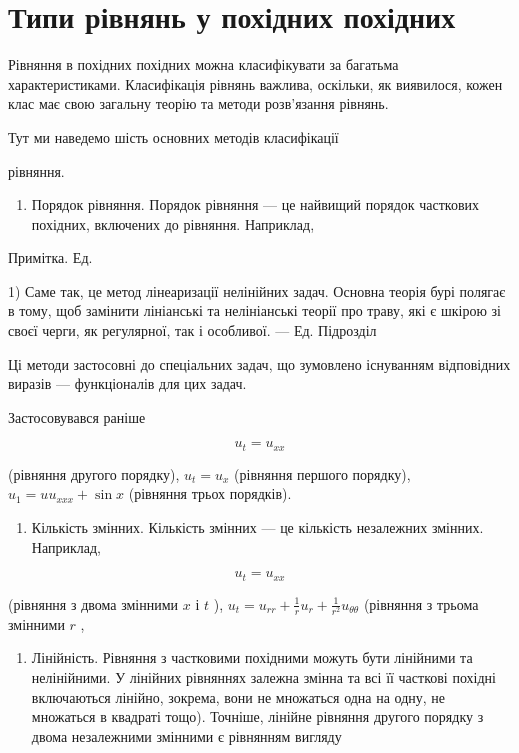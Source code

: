 \documentclass[
  ukrainian,
]{article}
\providecommand{\tightlist}{%
  \setlength{\itemsep}{0pt}\setlength{\parskip}{0pt}}
\begin{document}
\section{Типи рівнянь у похідних
похідних}\label{ux442ux438ux43fux438-ux440ux456ux432ux43dux44fux43dux44c-ux443-ux43fux43eux445ux456ux434ux43dux438ux445-ux43fux43eux445ux456ux434ux43dux438ux445}

Рівняння в похідних похідних можна класифікувати за багатьма
характеристиками. Класифікація рівнянь важлива, оскільки, як виявилося,
кожен клас має свою загальну теорію та методи розв'язання рівнянь.

Тут ми наведемо шість основних методів класифікації

рівняння.

\begin{enumerate}
\def\labelenumi{\arabic{enumi}.}
\tightlist
\item
  Порядок рівняння. Порядок рівняння --- це найвищий порядок часткових
  похідних, включених до рівняння. Наприклад,
\end{enumerate}

Примітка. Ед.

1) Саме так, це метод лінеаризації нелінійних задач. Основна теорія бурі
полягає в тому, щоб замінити лініанські та нелініанські теорії про
траву, які є шкірою зі своєї черги, як регулярної, так і особливої. ---
Ед. Підрозділ

Ці методи застосовні до спеціальних задач, що зумовлено існуванням
відповідних виразів --- функціоналів для цих задач.

Застосовувався раніше

\[
u_t = u_{xx}
\]

(рівняння другого порядку), \(u_t = u_x\) (рівняння першого порядку),
\(u_1 = uu_{xxx} + \sin x\) (рівняння трьох порядків).

\begin{enumerate}
\def\labelenumi{\arabic{enumi}.}
\setcounter{enumi}{1}
\tightlist
\item
  Кількість змінних. Кількість змінних --- це кількість незалежних
  змінних. Наприклад,
\end{enumerate}

\[
u_t = u_{xx}
\]

(рівняння з двома змінними \(x\) і \(t\) ),
\(u_t = u_{rr} + \frac{1}{r} u_r + \frac{1}{r^2} u_{\theta\theta}\)
(рівняння з трьома змінними \(r\) ,

\begin{enumerate}
\def\labelenumi{\arabic{enumi}.}
\setcounter{enumi}{2}
\tightlist
\item
  Лінійність. Рівняння з частковими похідними можуть бути лінійними та
  нелінійними. У лінійних рівняннях залежна змінна та всі її часткові
  похідні включаються лінійно, зокрема, вони не множаться одна на одну,
  не множаться в квадраті тощо). Точніше, лінійне рівняння другого
  порядку з двома незалежними змінними є рівнянням вигляду
\end{enumerate}
\end{document}

